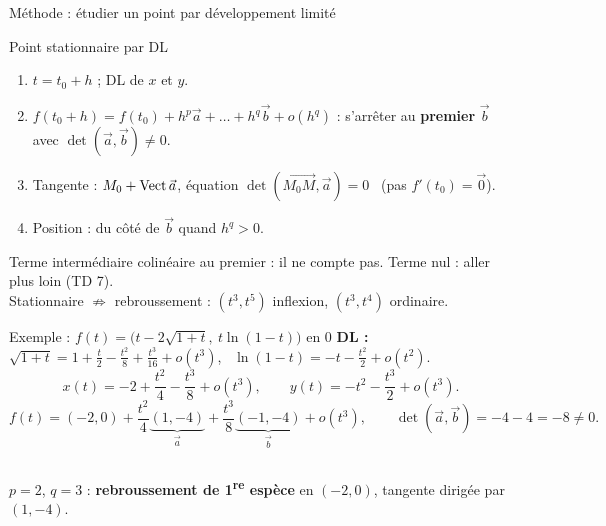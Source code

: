 \documentclass[aspectratio=169,11pt]{beamer}
\newcommand{\vv}[1]{\overrightarrow{#1}}\newcommand{\ve}[1]{\vec{#1}}
\begin{document}
\begin{frame}{Méthode : étudier un point par développement limité}
\begin{METH}{Point stationnaire par DL}
\begin{enumerate}
\item $t=t_0+h$ ; DL de $x$ et $y$.
\item $f(t_0+h)=f(t_0)+h^p\ve a+\dots+h^q\ve b+o(h^q)$ : s'arrêter au \textbf{premier} $\ve b$ avec $\det(\ve a,\ve b)\neq0$.
\item Tangente : $M_0+\vect\ve a$, équation $\det(\vv{M_0M},\ve a)=0$ \ (\alert{pas} $f'(t_0)=\ve0$).
\item Position : du côté de $\ve b$ quand $h^q>0$.
\end{enumerate}
\end{METH}
\pause
\begin{PIEGE}[Pièges]
Terme intermédiaire colinéaire au premier : il ne compte pas. Terme nul : aller plus loin (TD 7).\\
Stationnaire $\not\Rightarrow$ rebroussement : $(t^3,t^5)$ inflexion, $(t^3,t^4)$ ordinaire.
\end{PIEGE}
\end{frame}

\begin{frame}{Exemple : $f(t)=\big(t-2\sqrt{1+t},\ t\ln(1-t)\big)$ en $0$}
\pause
\textbf{DL :} $\sqrt{1+t}=1+\frac t2-\frac{t^2}8+\frac{t^3}{16}+o(t^3)$, \ $\ln(1-t)=-t-\frac{t^2}2+o(t^2)$.
\pause
\[x(t)=-2+\frac{t^2}4-\frac{t^3}8+o(t^3),\qquad y(t)=-t^2-\frac{t^3}2+o(t^3).\]
\pause
\[f(t)=(-2,0)+\frac{t^2}4\underbrace{(1,-4)}_{\ve a}+\frac{t^3}8\underbrace{(-1,-4)}_{\ve b}+o(t^3),\qquad
\det(\ve a,\ve b)=-4-4=-8\neq0.\]
\pause
\begin{columns}[c]
\begin{RETENIR}
$p=2$, $q=3$ : \textbf{rebroussement de 1\textsuperscript{re} espèce} en $(-2,0)$, tangente dirigée par $(1,-4)$.
\end{RETENIR}
\centering
{}
\end{columns}
\end{frame}
\end{document}
